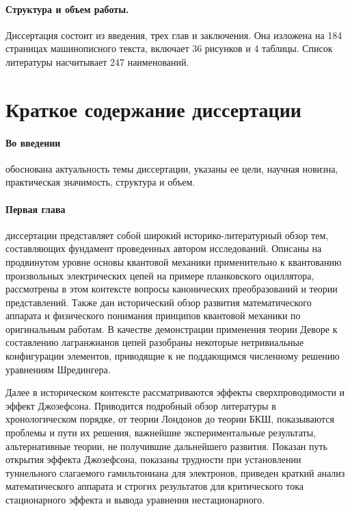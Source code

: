 \documentclass[14pt, a4paper]{extarticle}
\begin{document}
\paragraph{Структура и объем работы.} Диссертация состоит из введения, трех глав и заключения. Она изложена на 184 страницах машинописного текста, включает 36 рисунков и 4 таблицы. Список литературы насчитывает 247 наименований.

\section*{Краткое содержание диссертации}

\paragraph{Во введении} обоснована актуальность темы диссертации, указаны ее цели, научная новизна, практическая значимость, структура и объем.

\paragraph{Первая глава} диссертации представляет собой широкий историко-литературный обзор тем, составляющих фундамент проведенных автором исследований. Описаны на продвинутом уровне основы квантовой механики применительно к квантованию произвольных электрических цепей на примере планковского оциллятора, рассмотрены в этом контексте вопросы канонических преобразований и теории представлений. Также дан исторический обзор развития математического аппарата и физического понимания принципов квантовой механики по оригинальным работам. В качестве демонстрации применения теории Деворе к составлению лагранжианов цепей разобраны некоторые нетривиальные конфигурации элементов, приводящие к не поддающимся численному решению уравнениям Шредингера. 

Далее в историческом контексте рассматриваются эффекты сверхпроводимости и эффект Джозефсона. Приводится подробный обзор литературы в хронологическом порядке, от теории Лондонов до теории БКШ, показываются проблемы и пути их решения, важнейшие экспериментальные результаты, альтернативные теории, не получившие дальнейшего развития. Показан путь открытия эффекта Джозефсона, показаны трудности при установлении туннельного слагаемого гамильтониана для электронов, приведен краткий анализ математического аппарата и строгих результатов для критического тока стационарного эффекта и вывода уравнения нестационарного. 
\end{document}
